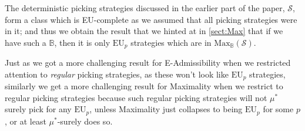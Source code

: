 \documentclass[a4paper]{article}
\renewcommand\P{\mathbb{P}} %
\newcommand\Exp{\mathsf{Exp}}
\newcommand\EU{\mathrm{EU}}
\newcommand\U{\mathfrak{U}} %
\newcommand\Maximality{\mathrm{Max}}
\renewcommand\S{\mathcal{S}}
\newcommand\s{\mathsf{s}}
\newcommand{\n}{\mathsf{n}}
\newcommand{\IB}{\mathbb{B}}
\newcommand{\IP}{\P}
\newcommand{\todoold}[2][]{\todo[backgroundcolor=white,bordercolor=orange!10,linecolor=gray!10, #1,caption={},textcolor=gray]{Pre-rev: #2}}
\newcommand{\todooldinfo}[2][]{\todoold[#1]{#2}}
\newenvironment{CCM rewritten}
{\begingroup\color{blue}} %
{\endgroup}              %
\begin{document}
	
	

	

The deterministic picking strategies discussed in the earlier part of the paper, $\S$, form a class which is EU-complete as we assumed that all picking strategies were in it; and thus we obtain the result that we hinted at in \cref{sect:Max} that if we have such a $\IB$, then it is only $\EU_p$ strategies which are in $\Maximality_\IB(\S)$.



Just as we got a more challenging result for E-Admissibility when we restricted attention to \emph{regular} picking strategies, as these won't look like $\EU_p$ strategies, similarly we get a more challenging result for Maximality when we restrict to regular picking strategies because such regular picking strategies will not $\mu^*$ surely pick for any $\EU_p$, unless Maximality just collapses to being $\EU_p$ for some $p$, or at least $\mu^*$-surely does so.
\end{document}
